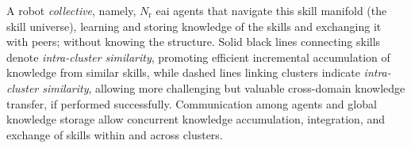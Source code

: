 \documentclass[12pt]{article}
\newcommand\myhl[1]{\textcolor{red}{#1}}
\renewcommand{\emph}[1]{\textit{#1}}
\begin{document}
A robot \emph{collective}, namely, $N_\mathrm{r}$ \ac{eai} agents that navigate this skill manifold (the skill universe), learning and storing knowledge of the skills and exchanging it with peers; without knowing the structure. Solid black lines connecting skills denote \textit{intra-cluster similarity}, promoting efficient incremental accumulation of knowledge from similar skills, while dashed lines linking clusters indicate \textit{intra-cluster similarity}, allowing more challenging but valuable cross-domain knowledge transfer, if performed successfully. Communication among agents and global knowledge storage allow concurrent knowledge accumulation, integration, and exchange of skills within and across clusters. 

\end{document}
